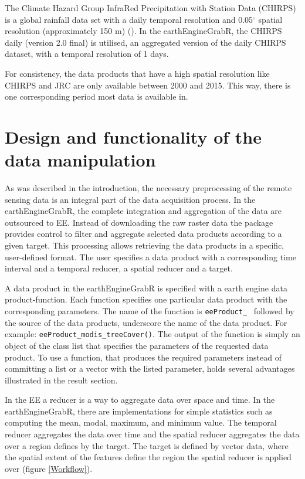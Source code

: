 The Climate Hazard Group InfraRed Precipitation with Station Data (CHIRPS) is a global rainfall data set with a daily temporal resolution and 0.05$^\circ$ spatial resolution (approximately 150 m) (\cite{funk2015climate}). In the earthEngineGrabR, the CHIRPS daily (version 2.0 final) is utilised, an aggregated version of the daily CHIRPS dataset, with a temporal resolution of 1 days.

For consistency, the data products that have a high spatial resolution like CHIRPS and JRC are only available between 2000 and 2015. This way, there is one corresponding period most data is available in.

\section{Design and functionality of the \\ data manipulation}

As was described in the introduction, the necessary preprocessing of the remote sensing data is an integral part of the data acquisition process. In the earthEngineGrabR, the complete integration and aggregation of the data are outsourced to EE.
Instead of downloading the raw raster data the package provides control to filter and aggregate selected data products according to a given target. This processing allows retrieving the data products in a specific, user-defined format. The user specifies a data product with a corresponding time interval and a temporal reducer, a spatial reducer and a target. 

A data product in the earthEngineGrabR is specified with a earth engine data product-function. Each function specifies one particular data product with the corresponding parameters. The name of the function is \texttt{eeProduct\_ } followed by the source of the data products, underscore the name of the data product. For example: \texttt{eeProduct\_modis\_treeCover()}. The output of the function is simply an object of the class list that specifies the parameters of the requested data product. To use a function, that produces the required parameters instead of committing a list or a vector with the listed parameter, holds several advantages illustrated in the result section.

In the EE a reducer is a way to aggregate data over space and time. In the earthEngineGrabR, there are implementations for simple statistics such as computing the mean, modal, maximum, and minimum value. The temporal reducer aggregates the data over time and the spatial reducer aggregates the data over a region defines by the target. 
The target is defined by vector data, where the spatial extent of the features define the region the spatial reducer is applied over (figure \ref*{Workflow}).

